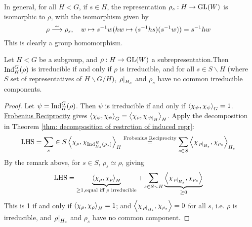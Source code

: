 \documentclass{article}
\begin{document}
\begin{remark}
    In general, for all $H < G$, if $s \in H$, the representation $\rho_s : H \to \mathrm{GL}(W)$ is isomorphic to $\rho$, with the isomorphism given by
    \[
        \rho \overset{\sim}{\longrightarrow} \rho_s, \quad w \mapsto s^{-1}w (hw \mapsto (s^{-1}hs)(s^{-1}w)) = s^{-1} hw
    \]
    This is clearly a group homomorphism.
\end{remark}

\begin{theorem}
    Let $H < G$ be a subgroup, and $\rho: H \to \mathrm{GL}(W)$ a subrepresentation.Then $\mathrm{Ind}_H^G (\rho)$ is irreducible if and only if $\rho$ is irreducible, and for all $s \in S \smallsetminus H$ (where $S$ set of representatives of $H \smallsetminus G / H$), $\left.\rho\right|_{H_s}$ and $\rho_s$ have no common irreducible components.
\end{theorem}

\begin{proof}
    Let $\psi = \mathrm{Ind}_H^G (\rho)$. Then $\psi$ is irreducible if and only if $\left\langle \chi_{\psi}, \chi_{\psi} \right\rangle_G = 1$. \hyperref[thm: Frobenius Reciprocity]{Frobenius Reciprocity} gives $\left\langle \chi_{\psi}, \chi_{\psi} \right\rangle_G = \left\langle \chi_{\rho}, \chi_{\left.\psi\right|_{H}} \right\rangle_H$. Apply the decomposition in Theorem \ref{thm: decomposition of restrction of induced repr}:
    \[
        \text{LHS} = \sum_s \in S \left\langle \chi_{\rho}, \chi_{\mathrm{Ind}_{H_s}^H (\rho_s)} \right\rangle_H \overset{\text{Frobenius Reciprocity}}{=} \sum_{s \in S} \left\langle \chi_{\left.\rho\right|_{H_s}}, \chi_{\rho_s} \right\rangle_{H_s}
    \]
    By the remark above, for $s \in S$, $\rho_s \simeq \rho$, giving
    \[
        \text{LHS} = \underbrace{\left\langle \chi_{\rho}, \chi_{\rho} \right\rangle_H}_{\geq 1, \text{equal iff $\rho$ irreducible}} + \sum_{s \in S \smallsetminus H} \underbrace{\left\langle \chi_{\left.\rho\right|_{H_s}}, \chi_{\rho_s} \right\rangle}_{\geq 0}
    \]
    This is 1 if and only if $\left\langle \chi_{\rho}, \chi_{\rho} \right\rangle_H = 1$; and $\left\langle \chi_{\left.\rho\right|_{H_s}}, \chi_{\rho_s} \right\rangle = 0$ for all $s$, i.e. $\rho$ is irreducible, and $\left.\rho\right|_{H_s}$ and $\rho_s$ have no common component.
\end{proof}
\end{document}
